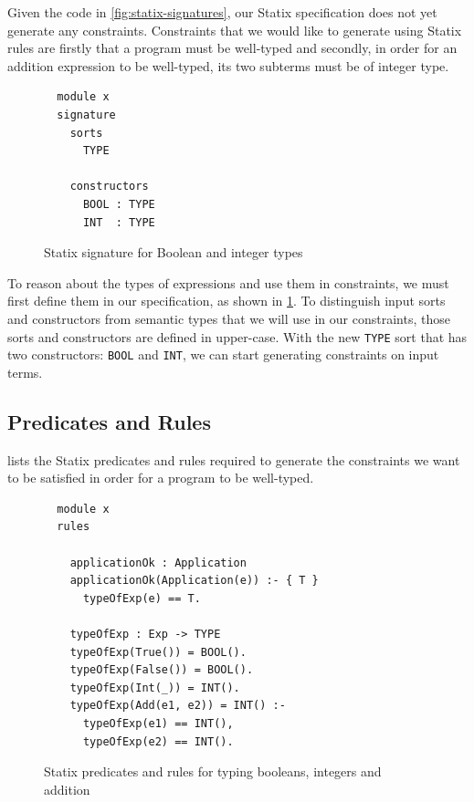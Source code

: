       Given the code in \cref{fig:statix-signatures}, our Statix specification does not yet generate any constraints. Constraints that we would like to generate using Statix rules are firstly that a program must be well-typed and secondly, in order for an addition expression to be well-typed, its two subterms must be of integer type.

      \begin{figure}
        \vspace{-20pt}
        \capstart
        \begin{verbatim}
  module x
  signature
    sorts
      TYPE
    
    constructors
      BOOL : TYPE
      INT  : TYPE
        \end{verbatim}
        \caption{\label{fig:statix-type-signatures}Statix signature for Boolean and integer types}
        \vspace{-40pt}
      \end{figure}

      To reason about the types of expressions and use them in constraints, we must first define them in our specification, as shown in \cref{fig:statix-type-signatures}. To distinguish input sorts and constructors from semantic types that we will use in our constraints, those sorts and constructors are defined in upper-case. With the new \texttt{TYPE} sort that has two constructors: \texttt{BOOL} and \texttt{INT}, we can start generating constraints on input terms.

    \subsection{Predicates and Rules}

       lists the Statix predicates and rules required to generate the constraints we want to be satisfied in order for a program to be well-typed. 

      \begin{figure}[H]
        \begin{verbatim}
  module x
  rules

    applicationOk : Application
    applicationOk(Application(e)) :- { T }
      typeOfExp(e) == T.

    typeOfExp : Exp -> TYPE
    typeOfExp(True()) = BOOL().
    typeOfExp(False()) = BOOL().
    typeOfExp(Int(_)) = INT().
    typeOfExp(Add(e1, e2)) = INT() :-
      typeOfExp(e1) == INT(),
      typeOfExp(e2) == INT().
        \end{verbatim}
        \caption{\label{fig:statix-basic-rules}Statix predicates and rules for typing booleans, integers and addition}
      \end{figure}

